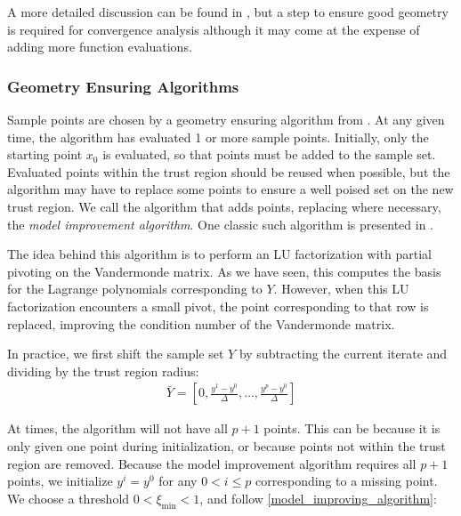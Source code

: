 \documentclass{article}
\theoremstyle{case}
\newcommand{\ximin}{\xi_{\text{min}}}
\begin{document}
A more detailed discussion can be found in \cite{doi:10.1080/10556780802409296}, but a step to ensure good geometry is required for convergence analysis although it may come at the expense of adding more function evaluations.

\subsubsection{Geometry Ensuring Algorithms}

Sample points are chosen by a geometry ensuring algorithm from \cite{DUMMY:intro_book}.
At any given time, the algorithm has evaluated 1 or more sample points.
Initially, only the starting point $x_0$ is evaluated, so that points must be added to the sample set.
Evaluated points within the trust region should be reused when possible, but the algorithm may have to replace some points to ensure a well poised set on the new trust region.
We call the algorithm that adds points, replacing where necessary, the \emph{model improvement algorithm}.
One classic such algorithm is presented in \cite{DUMMY:intro_book}.

The idea behind this algorithm is to perform an LU factorization with partial pivoting on the Vandermonde matrix.
As we have seen, this computes the basis for the Lagrange polynomials corresponding to $Y$.
However, when this LU factorization encounters a small pivot, the point corresponding to that row is replaced, improving the condition number of the Vandermonde matrix.

In practice, we first shift the sample set $Y$ by subtracting the current iterate and dividing by the trust region radius:
\begin{align}
\bar{Y} = [0, \frac{y^1 - y^0}{\Delta}, \ldots, \frac{y^p - y^0}{\Delta}]
\end{align}

At times, the algorithm will not have all $p+1$ points.
This can be because it is only given one point during initialization, or because points not within the trust region are removed.
Because the model improvement algorithm requires all $p+1$ points, we initialize $y^i = y^0$ for any $0 < i \le p$ corresponding to a missing point.
We choose a threshold $0 < \ximin < 1$, and follow \cref{model_improving_algorithm}:
\end{document}

